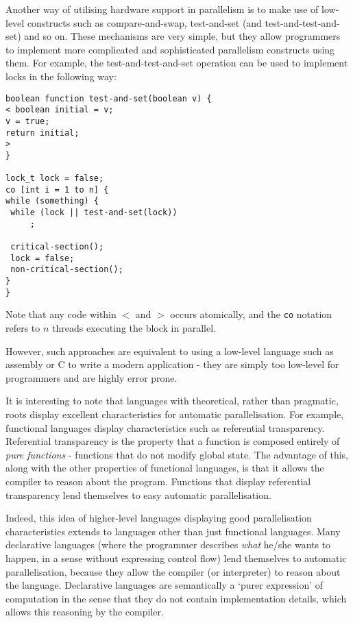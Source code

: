 Another way of utilising hardware support in parallelism is to make use of low-level constructs such as compare-and-swap, test-and-set (and test-and-test-and-set) and so on. These mechanisms are very simple, but they allow programmers to implement more complicated and sophisticated parallelism constructs using them. For example, the test-and-test-and-set operation can be used to implement locks in the following way:

\begin{verbatim}
boolean function test-and-set(boolean v) {
< boolean initial = v;
v = true;
return initial;
>  
}

lock_t lock = false;
co [int i = 1 to n] {
while (something) {
 while (lock || test-and-set(lock))
     ;
     
 critical-section();
 lock = false;
 non-critical-section();
}
}
\end{verbatim}

{\small Note that any code within $<$ and $>$ occurs atomically, and the \texttt{co} notation refers to $n$ threads executing the block in parallel.}

However, such approaches are equivalent to using a low-level language such as assembly or C to write a modern application - they are simply too low-level for programmers and are highly error prone.

It is interesting to note that languages with theoretical, rather than pragmatic, roots display excellent characteristics for automatic parallelisation. For example, functional languages display characteristics such as referential transparency. Referential transparency is the property that a function is composed entirely of \textit{pure functions} - functions that do not modify global state. The advantage of this, along with the other properties of functional languages, is that it allows the compiler to reason about the program. Functions that display referential transparency lend themselves to easy automatic parallelisation.

Indeed, this idea of higher-level languages displaying good parallelisation characteristics extends to languages other than just functional languages. Many declarative languages (where the programmer describes \emph{what} he/she wants to happen, in a sense without expressing control flow) lend themselves to automatic parallelisation, because they allow the compiler (or interpreter) to reason about the language. Declarative languages are semantically a `purer expression' of computation in the sense that they do not contain implementation details, which allows this reasoning by the compiler.

